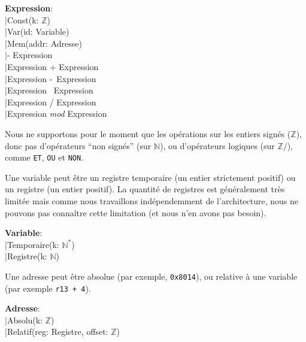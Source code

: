 \documentclass[french]{article}
\begin{document}
  \begin{algorithm}[H]
        \textbf{Expression}:\\
            \qquad |\quad Const(k: $\mathds{Z}$)\\
            \qquad |\quad Var(id: Variable)\\
            \qquad |\quad Mem(addr: Adresse)\\
            \qquad |\quad \-- Expression\\
            \qquad |\quad Expression + Expression\\
            \qquad |\quad Expression \--\ Expression\\
            \qquad |\quad Expression \texttimes\ Expression\\
            \qquad |\quad Expression / Expression\\
            \qquad |\quad Expression \textit{mod} Expression\\
  \end{algorithm}
  
  Nous ne supportons pour le moment que les opérations sur les entiers signés ($\mathds{Z}$), donc pas d'opérateurs ``non signés'' (sur $\mathds{N}$), ou d'opérateurs logiques (sur $\mathds{Z}/$), comme \texttt{ET}, \texttt{OU} et \texttt{NON}.
  
  Une variable peut être un registre temporaire (un entier strictement positif) ou un registre (un entier positif). La quantité de registres est généralement très limitée mais comme nous travaillons indépendemment de l'architecture, nous ne pouvons pas connaître cette limitation (et nous n'en avons pas besoin).

  \begin{algorithm}[H]
        \textbf{Variable}:\\
            \qquad |\quad Temporaire(k: $\mathds{N^*}$)\\
            \qquad |\quad Registre(k: $\mathds{N}$)\\
  \end{algorithm}
  
  Une adresse peut être absolue (par exemple, \texttt{0x8014}), ou relative à une variable (par exemple \texttt{r13 + 4}).
  
  \begin{algorithm}[H]
        \textbf{Adresse}:\\
            \qquad |\quad Absolu(k: $\mathds{Z}$)\\
            \qquad |\quad Relatif(reg: Registre, offset: $\mathds{Z}$)\\
  \end{algorithm}
\end{document}

